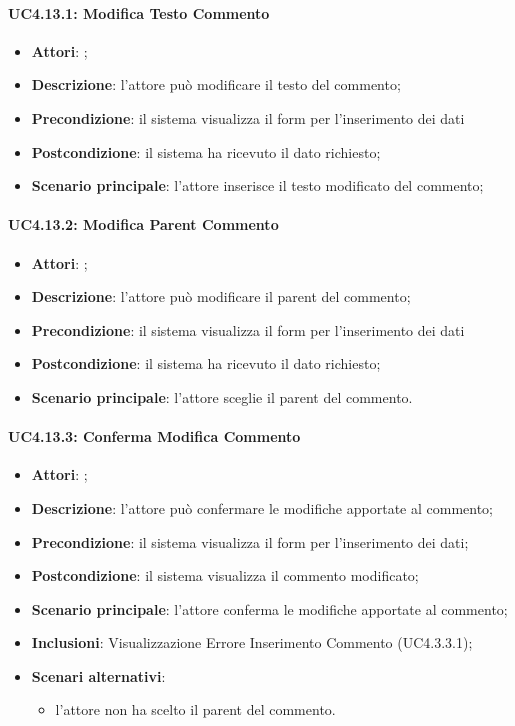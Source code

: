 \paragraph{UC4.13.1: Modifica Testo Commento}
\label{UC4.13.1}
\begin{itemize}
\item \textbf{Attori}: ;
\item \textbf{Descrizione}: l'attore può modificare il testo del commento;	
\item \textbf{Precondizione}: il sistema visualizza il form per l'inserimento dei dati	
\item \textbf{Postcondizione}: il sistema ha ricevuto il dato richiesto;	
\item \textbf{Scenario principale}:
l'attore inserisce il testo modificato del commento;	
\end{itemize}

\paragraph{UC4.13.2: Modifica Parent Commento}
\label{UC4.13.2}
\begin{itemize}
\item \textbf{Attori}: ;
\item \textbf{Descrizione}: l'attore può modificare il parent del commento;	
\item \textbf{Precondizione}: il sistema visualizza il form per l'inserimento dei dati	
\item \textbf{Postcondizione}: il sistema ha ricevuto il dato richiesto;	
\item \textbf{Scenario principale}:
l'attore sceglie il parent del commento.
\end{itemize}

\paragraph{UC4.13.3: Conferma Modifica Commento}
\label{UC4.13.3}
\begin{itemize}
\item \textbf{Attori}: ;
\item \textbf{Descrizione}: l'attore può confermare le modifiche apportate al commento;	
\item \textbf{Precondizione}: il sistema visualizza il form per l'inserimento dei dati;	
\item \textbf{Postcondizione}: il sistema visualizza il commento modificato;	
\item \textbf{Scenario principale}:
l'attore conferma le modifiche apportate al commento;	
\item \textbf{Inclusioni}:
Visualizzazione Errore Inserimento Commento (UC4.3.3.1);
\item \textbf{Scenari alternativi}:
\begin{itemize}
\item l'attore non ha scelto il parent del commento. 
\end{itemize}
\end{itemize}

